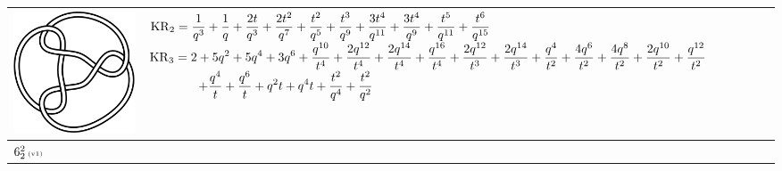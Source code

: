 \documentclass{compositio}
\theoremstyle{definition}
\numberwithin{equation}{section}
\begin{document}
{\begin{longtable}{p{}|p{}}
\includegraphics[scale=0.07,angle=0]{link6_1_3.pdf} 
& 
$
\displaystyle{%
\KR_{2} = \frac{1}{q^3}+\frac{1}{q}+\frac{2 t}{q^3}+\frac{2 t^2}{q^7}+\frac{t^2}{q^5}+\frac{t^3}{q^9}+\frac{3 t^4}{q^{11}}+\frac{3 t^4}{q^9}+\frac{t^5}{q^{11}}+\frac{t^6}{q^{15}}
}
$
\newline 
$
\displaystyle{%
\KR_{3} = 2+5 q^2+5 q^4+3 q^6+\frac{q^{10}}{t^4}+\frac{2 q^{12}}{t^4}+\frac{2 q^{14}}{t^4}+\frac{q^{16}}{t^4}+\frac{2 q^{12}}{t^3}+\frac{2 q^{14}}{t^3}+\frac{q^4}{t^2}+\frac{4 q^6}{t^2}+\frac{4 q^8}{t^2}+\frac{2 q^{10}}{t^2}+\frac{q^{12}}{t^2}
}
$
\newline
$
\displaystyle{%
\qquad\qquad +\frac{q^4}{t}+\frac{q^6}{t}+q^2 t+q^4 t+\frac{t^2}{q^4}+\frac{t^2}{q^2}
}
$
\\
\hline
$6_{2}^2\,\text{{\tiny (v1)}}$ 

\end{longtable}}
\end{document}
